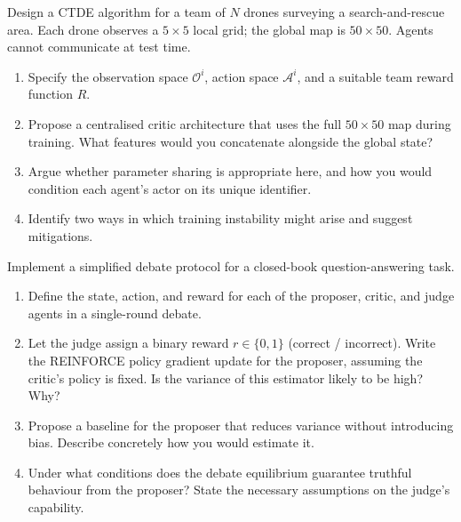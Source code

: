 \begin{exercise}
\label{ex:ctde-communication}
Design a CTDE algorithm for a team of $N$ drones surveying a
search-and-rescue area. Each drone observes a $5 \times 5$ local
grid; the global map is $50 \times 50$. Agents cannot communicate
at test time.
\begin{enumerate}[label=(\alph*)]
  \item Specify the observation space $\mathcal{O}^i$, action space
    $\mathcal{A}^i$, and a suitable team reward function $R$.
  \item Propose a centralised critic architecture that uses the
    full $50 \times 50$ map during training. What features would
    you concatenate alongside the global state?
  \item Argue whether parameter sharing is appropriate here, and
    how you would condition each agent's actor on its unique
    identifier.
  \item Identify two ways in which training instability might arise
    and suggest mitigations.
\end{enumerate}
\end{exercise}

\begin{exercise}
\label{ex:debate-reward}
Implement a simplified debate protocol for a closed-book
question-answering task.
\begin{enumerate}[label=(\alph*)]
  \item Define the state, action, and reward for each of the
    proposer, critic, and judge agents in a single-round debate.
  \item Let the judge assign a binary reward $r \in \{0, 1\}$
    (correct / incorrect). Write the REINFORCE policy gradient
    update for the proposer, assuming the critic's policy is
    fixed. Is the variance of this estimator likely to be high?
    Why?
  \item Propose a baseline for the proposer that reduces variance
    without introducing bias. Describe concretely how you would
    estimate it.
  \item Under what conditions does the debate equilibrium guarantee
    truthful behaviour from the proposer? State the necessary
    assumptions on the judge's capability.
\end{enumerate}
\end{exercise}

